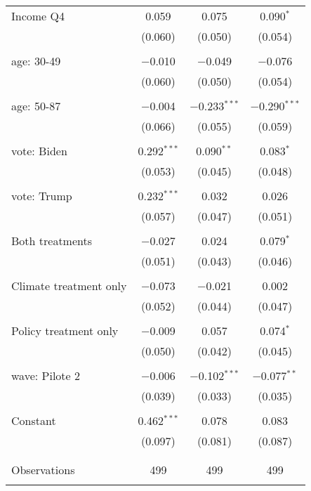 \begin{tabular}{@{\extracolsep{5pt}}lccc}
 Income Q4 & 0.059 & 0.075 & 0.090$^{*}$ \\ 
  & (0.060) & (0.050) & (0.054) \\ 
  & & & \\ 
 age: 30-49 & $-$0.010 & $-$0.049 & $-$0.076 \\ 
  & (0.060) & (0.050) & (0.054) \\ 
  & & & \\ 
 age: 50-87 & $-$0.004 & $-$0.233$^{***}$ & $-$0.290$^{***}$ \\ 
  & (0.066) & (0.055) & (0.059) \\ 
  & & & \\ 
 vote: Biden & 0.292$^{***}$ & 0.090$^{**}$ & 0.083$^{*}$ \\ 
  & (0.053) & (0.045) & (0.048) \\ 
  & & & \\ 
 vote: Trump & 0.232$^{***}$ & 0.032 & 0.026 \\ 
  & (0.057) & (0.047) & (0.051) \\ 
  & & & \\ 
 Both treatments & $-$0.027 & 0.024 & 0.079$^{*}$ \\ 
  & (0.051) & (0.043) & (0.046) \\ 
  & & & \\ 
 Climate treatment only & $-$0.073 & $-$0.021 & 0.002 \\ 
  & (0.052) & (0.044) & (0.047) \\ 
  & & & \\ 
 Policy treatment only & $-$0.009 & 0.057 & 0.074$^{*}$ \\ 
  & (0.050) & (0.042) & (0.045) \\ 
  & & & \\ 
 wave: Pilote 2 & $-$0.006 & $-$0.102$^{***}$ & $-$0.077$^{**}$ \\ 
  & (0.039) & (0.033) & (0.035) \\ 
  & & & \\ 
 Constant & 0.462$^{***}$ & 0.078 & 0.083 \\ 
  & (0.097) & (0.081) & (0.087) \\ 
  & & & \\ 
\hline \\[-1.8ex] 

Observations & 499 & 499 & 499 \\ 
\hline 
\hline \\[-1.8ex] 
\end{tabular} 